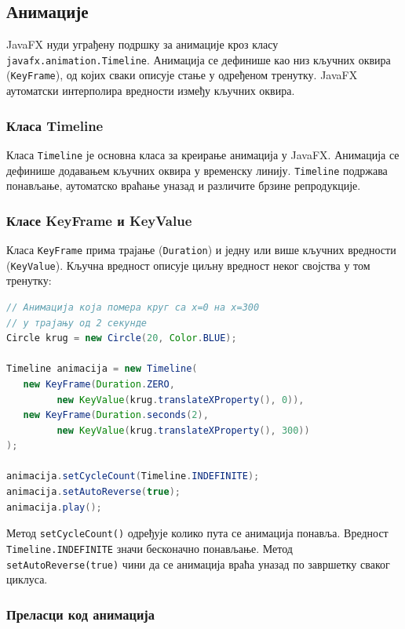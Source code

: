 \subsection{Анимације}

JavaFX нуди уграђену подршку за анимације кроз класу \texttt{javafx.animation.Timeline}. Анимација се дефинише као низ кључних оквира (\texttt{KeyFrame}), од којих сваки описује стање у одређеном тренутку. JavaFX аутоматски интерполира вредности између кључних оквира.

\subsubsection{Класа Timeline}

Класа \texttt{Timeline} је основна класа за креирање анимација у JavaFX. Анимација се дефинише додавањем кључних оквира у временску линију. \texttt{Timeline} подржава понављање, аутоматско враћање уназад и различите брзине репродукције.

\subsubsection{Класе KeyFrame и KeyValue}

Класа \texttt{KeyFrame} прима трајање (\texttt{Duration}) и једну или више кључних вредности (\texttt{KeyValue}). Кључна вредност описује циљну вредност неког својства у том тренутку:


\begin{lstlisting}[language=Java]
// Анимација која помера круг са x=0 на x=300
// у трајању од 2 секунде
Circle krug = new Circle(20, Color.BLUE);
 
Timeline animacija = new Timeline(
   new KeyFrame(Duration.ZERO,
         new KeyValue(krug.translateXProperty(), 0)),
   new KeyFrame(Duration.seconds(2),
         new KeyValue(krug.translateXProperty(), 300))
);
 
animacija.setCycleCount(Timeline.INDEFINITE);
animacija.setAutoReverse(true);
animacija.play();
\end{lstlisting}


Метод \texttt{setCycleCount()} одређује колико пута се анимација понавља. Вредност \texttt{Timeline.INDEFINITE} значи бесконачно понављање. Метод \texttt{setAutoReverse(true)} чини да се анимација враћа уназад по завршетку сваког циклуса.

\subsubsection{Преласци код анимација}

